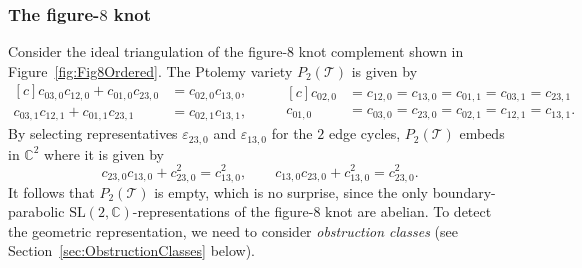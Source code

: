 \documentclass[12pt]{amsart}
\theoremstyle{definition}
\numberwithin{equation}{section}
\def\SL{\mathrm{SL}}
\def\C{\mathbb{C}}
\def\T{\mathcal{T}}
\begin{document}
\subsubsection{The figure-$8$ knot}
Consider the ideal triangulation of the figure-$8$ knot complement shown in Figure~\ref{fig:Fig8Ordered}. The Ptolemy variety $P_2(\T)$ is given by
\begin{equation}\label{eq:Fig8PtolemyUnsimplified}
\begin{aligned}[c]
c_{03,0}c_{12,0}+c_{01,0}c_{23,0}&=c_{02,0}c_{13,0},\\
c_{03,1}c_{12,1}+c_{01,1}c_{23,1}&=c_{02,1}c_{13,1},
\end{aligned}
\qquad 
\begin{aligned}[c]
c_{02,0}&=c_{12,0}=c_{13,0}=c_{01,1}=c_{03,1}=c_{23,1}\\
c_{01,0}&=c_{03,0}=c_{23,0}=c_{02,1}=c_{12,1}=c_{13,1}.
\end{aligned}
\end{equation}
By selecting representatives $\varepsilon_{23,0}$ and $\varepsilon_{13,0}$ for the $2$ edge cycles, $P_2(\T)$ embeds in $\C^2$ where it is given by
\begin{equation}\label{eq:Fig8PtolemyTrivial}
c_{23,0}c_{13,0}+c_{23,0}^2=c_{13,0}^2,\qquad c_{13,0}c_{23,0}+c_{13,0}^2=c_{23,0}^2.
\end{equation}
It follows that $P_2(\T)$ is empty, which is no surprise, since the only boundary-parabolic $\SL(2,\C)$-representations of the figure-$8$ knot are abelian. To detect the geometric representation, we need to consider \emph{obstruction classes} (see Section~\ref{sec:ObstructionClasses} below).
\end{document}
